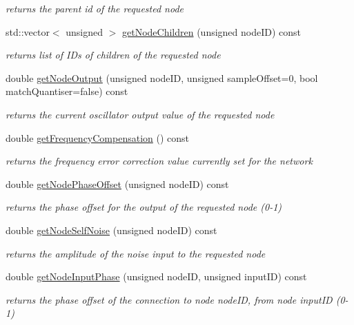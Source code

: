 \begin{DoxyCompactItemize}
\begin{DoxyCompactList}\small\item\em returns the parent id of the requested node \end{DoxyCompactList}\item 
std\+::vector$<$ unsigned $>$ \hyperlink{classMatsuokaEngine_a17ad3eb6cd60eed4d9abe99231f03ade}{get\+Node\+Children} (unsigned node\+ID) const 
\begin{DoxyCompactList}\small\item\em returns list of I\+Ds of children of the requested node \end{DoxyCompactList}\item 
double \hyperlink{classMatsuokaEngine_acb7268dacec8e66b987e34c17eddff9c}{get\+Node\+Output} (unsigned node\+ID, unsigned sample\+Offset=0, bool match\+Quantiser=false) const 
\begin{DoxyCompactList}\small\item\em returns the current oscillator output value of the requested node \end{DoxyCompactList}\item 
double \hyperlink{classMatsuokaEngine_a9437f514466a7140d0e56cf8412c4b4b}{get\+Frequency\+Compensation} () const 
\begin{DoxyCompactList}\small\item\em returns the frequency error correction value currently set for the network \end{DoxyCompactList}\item 
double \hyperlink{classMatsuokaEngine_a4210f67e9d3b63b89bd95efb9bd25a75}{get\+Node\+Phase\+Offset} (unsigned node\+ID) const 
\begin{DoxyCompactList}\small\item\em returns the phase offset for the output of the requested node (0-\/1) \end{DoxyCompactList}\item 
double \hyperlink{classMatsuokaEngine_ad51317a2033abd4f8a54816805b3fb38}{get\+Node\+Self\+Noise} (unsigned node\+ID) const 
\begin{DoxyCompactList}\small\item\em returns the amplitude of the noise input to the requested node \end{DoxyCompactList}\item 
double \hyperlink{classMatsuokaEngine_a17f7d97d16ee60a54a42bf132e2c8519}{get\+Node\+Input\+Phase} (unsigned node\+ID, unsigned input\+ID) const 
\begin{DoxyCompactList}\small\item\em returns the phase offset of the connection to node node\+ID, from node input\+ID (0-\/1) \end{DoxyCompactList}\item 

\end{DoxyCompactItemize}
